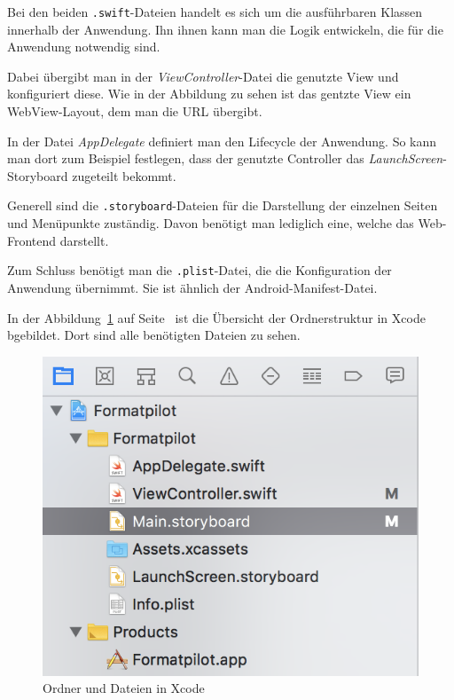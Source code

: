 Bei den beiden \texttt{.swift}-Dateien handelt es sich um die ausführbaren Klassen innerhalb der Anwendung. Ihn ihnen
kann man die Logik entwickeln, die für die Anwendung notwendig sind.

Dabei übergibt man in der \textit{ViewController}-Datei die genutzte View und konfiguriert diese. Wie in der Abbildung
zu sehen ist das gentzte View ein WebView-Layout, dem man die URL übergibt.

In der Datei \textit{AppDelegate} definiert man den Lifecycle der Anwendung. So kann man dort zum Beispiel festlegen,
dass der genutzte Controller das \textit{LaunchScreen}-Storyboard zugeteilt bekommt.

Generell sind die \texttt{.storyboard}-Dateien für die Darstellung der einzelnen Seiten und Menüpunkte zuständig. Davon
benötigt man lediglich eine, welche das Web-Frontend darstellt.

Zum Schluss benötigt man die \texttt{.plist}-Datei, die die Konfiguration der Anwendung übernimmt. Sie ist ähnlich der
Android-Manifest-Datei.

In der Abbildung~\ref{fig:umsetzung_ios_folder} auf Seite~\pageref{fig:umsetzung_ios_folder} ist die Übersicht der
Ordnerstruktur in Xcode bgebildet. Dort sind alle benötigten Dateien zu sehen.

\begin{figure}[h]
    \centering
    \includegraphics[scale=0.6]{images/kapitel_4/ios_folder.png}
    \caption{Ordner und Dateien in Xcode}
    \label{fig:umsetzung_ios_folder}
\end{figure}

